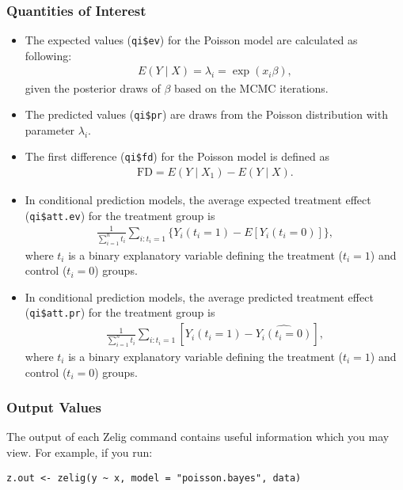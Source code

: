 \subsubsection{Quantities of Interest}

\begin{itemize}
\item The expected values (\texttt{qi\$ev}) for the Poisson model are
calculated as following:
\begin{eqnarray*}
E(Y\mid X) = \lambda_i = \exp(x_i \beta),
\end{eqnarray*}
given the posterior draws of $\beta$ based on the MCMC iterations.

\item The predicted values (\texttt{qi\$pr}) are draws from the Poisson
distribution with parameter $\lambda_i$.

\item The first difference (\texttt{qi\$fd}) for the Poisson model is defined
as
\begin{eqnarray*}
\text{FD}=E(Y\mid X_{1})-E(Y\mid X).
\end{eqnarray*}

\item In conditional prediction models, the average expected treatment effect
(\texttt{qi\$att.ev}) for the treatment group is
\begin{eqnarray*}
\frac{1}{\sum_{i=1}^n t_{i}}\sum_{i:t_{i}=1}\{Y_{i}(t_{i}=1)-E[Y_{i}(t_{i}=0)]\},
\end{eqnarray*}
where $t_{i}$ is a binary explanatory variable defining the treatment
($t_{i}=1$) and control ($t_{i}=0$) groups.

\item In conditional prediction models, the average predicted treatment effect
(\texttt{qi\$att.pr}) for the treatment group is
\begin{eqnarray*}
\frac{1}{\sum_{i=1}^n t_{i}}\sum_{i:t_{i}=1}[Y_{i}(t_{i}=1)-\widehat{Y_{i}(t_{i}=0)}],
\end{eqnarray*}
where $t_{i}$ is a binary explanatory variable defining the treatment
($t_{i}=1$) and control ($t_{i}=0$) groups.
\end{itemize}

\subsubsection{Output Values}

The output of each Zelig command contains useful information which you may
view. For example, if you run:
\begin{verbatim}
z.out <- zelig(y ~ x, model = "poisson.bayes", data)
\end{verbatim}


